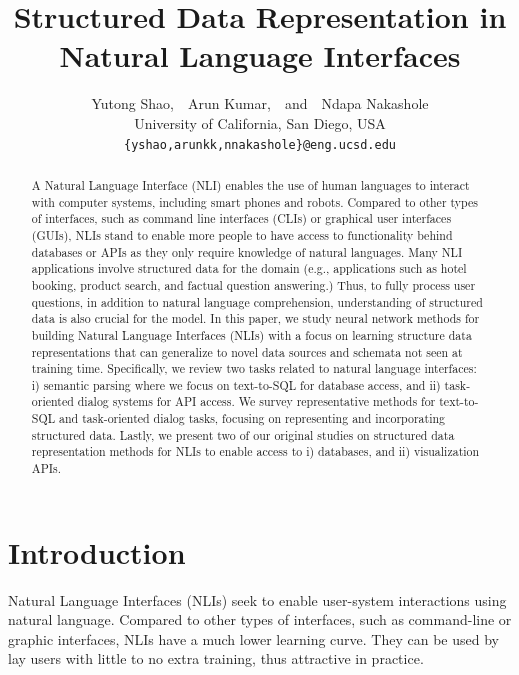 \documentclass[11pt,dvipdfm]{article}
\begin{document}
\title{Structured Data Representation in Natural Language Interfaces}
\author{Yutong Shao,~~Arun Kumar,~~and~~Ndapa Nakashole\\
University of California, San Diego, USA\\
\texttt{\{yshao,arunkk,nnakashole\}@eng.ucsd.edu}}
\maketitle

\begin{abstract}
A Natural Language Interface (NLI)  enables the  use of human languages to interact with computer systems,  including smart phones and robots. Compared to other types of interfaces, such as  command line interfaces (CLIs) or graphical user interfaces (GUIs), NLIs stand to enable more people to have access to functionality behind databases or APIs as they only require knowledge of natural languages. Many NLI applications involve structured data for the domain (e.g., applications such as hotel booking, product search, and factual question answering.) Thus, to fully process user questions, in addition to natural language comprehension, understanding of structured data is also crucial for the model.
In this paper, we study neural network methods for building Natural Language Interfaces (NLIs) with a  focus on learning structure data representations that can generalize to novel  data sources and schemata not seen at training time. Specifically, we review two  tasks related to natural language interfaces: i) semantic parsing where we  focus on text-to-SQL  for database access,  and ii) task-oriented dialog  systems for API access. We survey representative methods for   text-to-SQL and  task-oriented dialog tasks,  focusing  on representing and incorporating structured data. Lastly, we  present two of our original studies on structured data representation methods for NLIs  to enable access to i)  databases, and ii) visualization APIs.
\end{abstract}

\section{Introduction}

Natural Language Interfaces (NLIs) seek to enable user-system interactions using natural language. Compared to other types of interfaces, such as command-line or graphic interfaces, NLIs have a much lower learning curve. They can be used by lay users with little to no extra training, thus attractive in practice.
\end{document}
